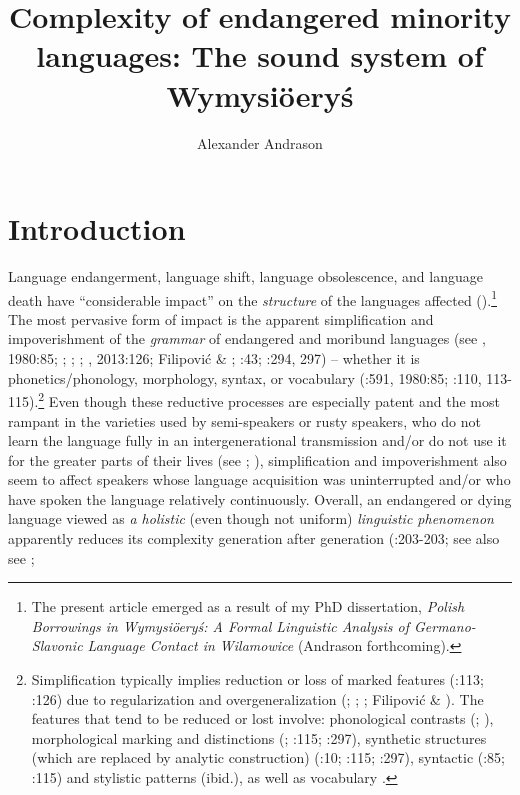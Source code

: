\documentclass[output=paper]{langscibook}
\author{Alexander Andrason\affiliation{Stellenbosch University}\orcid{}}
\title{Complexity of endangered minority languages: The sound system of Wymysiöeryś}
\begin{document}
\maketitle 
{}



\section{Introduction} %

Language endangerment, language shift, language obsolescence, and language death have “considerable impact” on the \textit{structure} of the languages affected (\citealt[110]{PalosaariCampbell2011}).\footnote{The present article emerged as a result of my PhD dissertation, \textit{Polish Borrowings in Wymysiöeryś: A Formal Linguistic Analysis of Germano-Slavonic Language Contact in Wilamowice} (Andrason forthcoming).} The most pervasive form of impact is the apparent simplification and impoverishment of the \textit{grammar} of endangered and moribund languages (see \citealt[590--591]{Dorian1973,19781973}, 1980:85; \citealt[9]{Silva-Corvalán1995}; \citealt[256]{MesthriEtAl2009}; \citealt[110--117]{PalosaariCampbell2011}; \citealt[101, 111, 118]{Sallabank2012}, 2013:126; Filipović \& \citealt[2]{Pütz2016}; \citealt{Aikhenvald2007}:43; \citealt{MeakinsEtAl2019}:294, 297) – whether it is phonetics/phonology, morphology, syntax, or vocabulary (\citealt{Dorian1978}:591, 1980:85; \citealt{PalosaariCampbell2011}:110, 113-115).\footnote{Simplification typically implies reduction or loss of marked features (\citealt{PalosaariCampbell2011}:113; \citealt{Sallabank2013}:126) due to regularization and overgeneralization (\citealt[9--10]{Silva-Corvalán1995}; \citealt[113]{PalosaariCampbell2011}; \citealt[126]{Sallabank2013}; Filipović \& \citealt[2]{Pütz2016}). The features that tend to be reduced or lost involve: phonological contrasts (\citealt[85]{Dorian1980}; \citealt[113]{PalosaariCampbell2011}), morphological marking and distinctions (\citealt[85]{Dorian1980}; \citealt{PalosaariCampbell2011}:115; \citealt{MeakinsEtAl2019}:297), synthetic structures (which are replaced by analytic construction) (\citealt{Silva-Corvalán1995}:10; \citealt{PalosaariCampbell2011}:115; \citealt{MeakinsEtAl2019}:297), syntactic (\citealt{Dorian1980}:85; \citealt{PalosaariCampbell2011}:115) and stylistic patterns (ibid.), as well as vocabulary \citep[118]{Sallabank2012}.} Even though these reductive processes are especially patent and the most rampant in the varieties used by semi-speakers or rusty speakers, who do not learn the language fully in an intergenerational transmission and/or do not use it for the greater parts of their lives (see \citealt{PalosaariCampbell2011}; \citealt{GrinevaldBert2011}), simplification and impoverishment also seem to affect speakers whose language acquisition was uninterrupted and/or who have spoken the language relatively continuously. Overall, an endangered or dying language viewed as \textit{a holistic} (even though not uniform) \textit{linguistic phenomenon} apparently reduces its complexity generation after generation (\citealt{Austin1986}:203-203; see also see \citealt{Dorian1978,19801978}; 
\end{document}
